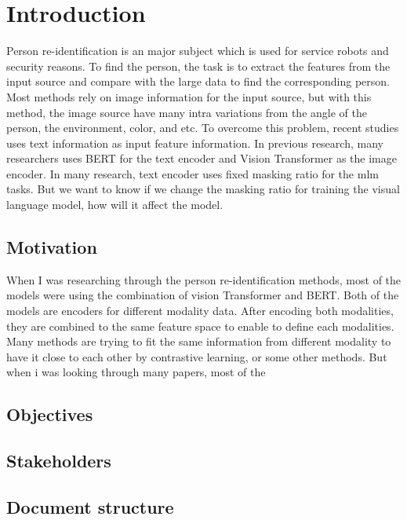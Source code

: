 \chapter{Introduction}
Person re-identification is an major subject which is used for service robots and security reasons. 
To find the person, the task is to extract the features from the input source and compare with the large data to find the corresponding person. Most methods rely on image information for the input source,%
 but with this method, the image source have many intra variations from the angle of the person, the environment, color, and etc.
To overcome this problem, recent studies uses text information as input feature information. 
In previous research, many researchers uses BERT for the text encoder and Vision Transformer as the image encoder. In many research, text encoder uses fixed masking ratio for the mlm tasks. But we want to know if we change the masking ratio for training the visual language model, how will it affect the model. 

\section{Motivation}
When I was researching through the person re-identification methods, most of the models were using the combination of vision Transformer and BERT. Both of the models are encoders for different modality data. After encoding both modalities, they are combined to the same feature space to enable to define each modalities. Many methods are trying to fit the same information from different modality to have it close to each other by contrastive learning, or some other methods. %
But when i was looking through many papers, most of the 

\section{Objectives}

\section{Stakeholders}

\section{Document structure}
